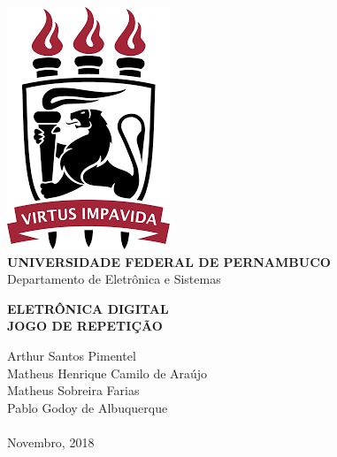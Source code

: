 \documentclass[14pt, oneside]{book}
\date{\vspace{-5ex}}
\theoremstyle{definition}
\begin{document}

    \begin{titlepage}
        \centering 
        \includegraphics[scale = 0.8]{ufpe.png} \\
        \Large{\textbf{UNIVERSIDADE FEDERAL DE PERNAMBUCO}}\\
        \large{Departamento de Eletrônica e Sistemas}
   
        \Huge\textbf{ELETRÔNICA DIGITAL}\\
        \Large\textbf{JOGO DE REPETIÇÃO}
   
        \vfill
        \Large{Arthur Santos Pimentel} \\
        \Large{Matheus Henrique Camilo de Araújo} \\
        \Large{Matheus Sobreira Farias} \\
        \Large{Pablo Godoy de Albuquerque}
        \\~\\
        \Large{Novembro, 2018}
    \end{titlepage}

\tableofcontents
\mainmatter
\end{document}
